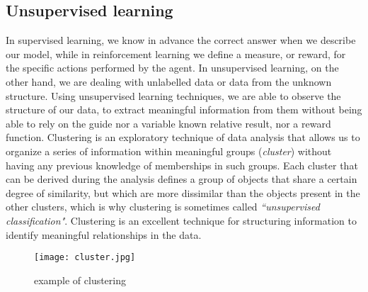 \subsection{Unsupervised learning}
\label{subsec:unsupervised-learning}
In supervised learning, we know in advance the correct answer when we describe
our model, while in reinforcement learning we define a measure, or reward, for
the specific actions performed by the agent. In unsupervised learning, on the
other hand, we are dealing with unlabelled data or data from the unknown
structure. Using unsupervised learning techniques, we are able to observe the
structure of our data, to extract meaningful information from them without being
able to rely on the guide nor a variable known relative result, nor a reward
function. Clustering is an exploratory technique of data analysis that allows us
to organize a series of information within meaningful groups (\emph{cluster})
without having any previous knowledge of memberships in such groups. Each
cluster that can be derived during the analysis defines a group of objects that
share a certain degree of similarity, but which are more dissimilar than the
objects present in the other clusters, which is why clustering is sometimes
called \emph{``unsupervised classification"}. Clustering is an excellent
technique for structuring information to identify meaningful relationships in
the data.\cite{raschka2016machine}
%
\begin{figure}[!h]
\centering
\texttt{[image: cluster.jpg]}
\caption{example of clustering}
\label{fig:unsupervised-learning-scheme}
\end{figure}
